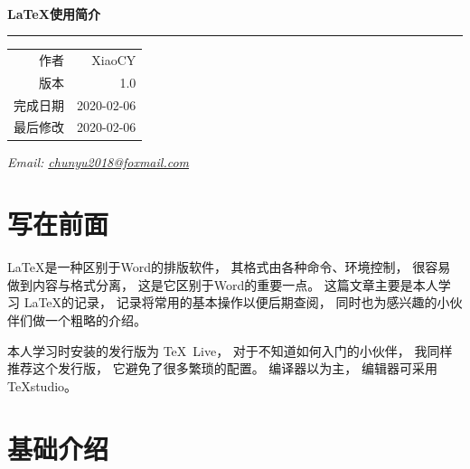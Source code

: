 \documentclass{ctexart}
\numberwithin{equation}{section}			%
\begin{document}
	\begin{titlepage}
		\ %
		
		\vspace{\fill}
		
		\begin{flushright}
			{\Huge\bfseries\LaTeX 使用简介} \\
			\rule[1em]{\linewidth}{0.5ex}
			
			\begin{tabular}{rr}
				作者 & XiaoCY \\
				版本 & 1.0 \\
				完成日期 & 2020-02-06 \\
				最后修改 & 2020-02-06 \\
			\end{tabular}
		\end{flushright}
		
		
		{\noindent\slshape Email: 
		 \href{mailto:chunyu2018@foxmail.com}
			{chunyu2018@foxmail.com}
		}
	\end{titlepage}

	
	\tableofcontents		%
	\clearpage
	
	\listoftables
	\clearpage
	
	\setcounter{page}{1}	%
	
	\section{写在前面}
	\LaTeX 是一种区别于Word的排版软件，
	其格式由各种命令、环境控制，
	很容易做到内容与格式分离，
	这是它区别于Word的重要一点。
	这篇文章主要是本人学习 \LaTeX 的记录\cite{liuhaiyang}，
	记录将常用的基本操作以便后期查阅，
	同时也为感兴趣的小伙伴们做一个粗略的介绍。
	
	本人学习时安装的发行版为 \TeX~Live，
	对于不知道如何入门的小伙伴，
	我同样推荐这个发行版，
	它避免了很多繁琐的配置。
	编译器以\XeLaTeX 为主，
	编辑器可采用TeXstudio。
	
	\section{基础介绍}
\end{document}
